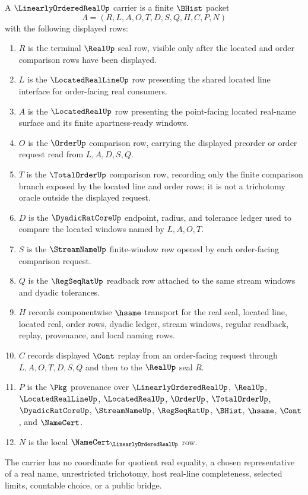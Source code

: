 \begin{definition}
\label{def:linearly-ordered-real-carrier}
A $\LinearlyOrderedRealUp$ carrier is a finite $\BHist$ packet
$$
\Lambda=(R,L,A,O,T,D,S,Q,H,C,P,N)
$$
with the following displayed rows:
\begin{enumerate}
\item $R$ is the terminal $\RealUp$ seal row, visible only after the located and order comparison rows have been displayed.
\item $L$ is the $\LocatedRealLineUp$ row presenting the shared located line interface for order-facing real consumers.
\item $A$ is the $\LocatedRealUp$ row presenting the point-facing located real-name surface and its finite apartness-ready windows.
\item $O$ is the $\OrderUp$ comparison row, carrying the displayed preorder or order request read from $L,A,D,S,Q$.
\item $T$ is the $\TotalOrderUp$ comparison row, recording only the finite comparison branch exposed by the located line and order rows; it is not a trichotomy oracle outside the displayed request.
\item $D$ is the $\DyadicRatCoreUp$ endpoint, radius, and tolerance ledger used to compare the located windows named by $L,A,O,T$.
\item $S$ is the $\StreamNameUp$ finite-window row opened by each order-facing comparison request.
\item $Q$ is the $\RegSeqRatUp$ readback row attached to the same stream windows and dyadic tolerances.
\item $H$ records componentwise $\hsame$ transport for the real seal, located line, located real, order rows, dyadic ledger, stream windows, regular readback, replay, provenance, and local naming rows.
\item $C$ records displayed $\Cont$ replay from an order-facing request through $L,A,O,T,D,S,Q$ and then to the $\RealUp$ seal $R$.
\item $P$ is the $\Pkg$ provenance over $\LinearlyOrderedRealUp$, $\RealUp$, $\LocatedRealLineUp$, $\LocatedRealUp$, $\OrderUp$, $\TotalOrderUp$, $\DyadicRatCoreUp$, $\StreamNameUp$, $\RegSeqRatUp$, $\BHist$, $\hsame$, $\Cont$, and $\NameCert$.
\item $N$ is the local $\NameCert_{\LinearlyOrderedRealUp}$ row.
\end{enumerate}
The carrier has no coordinate for quotient real equality, a chosen representative of a real name, unrestricted trichotomy, host real-line completeness, selected limits, countable choice, or a public bridge.
\end{definition}

